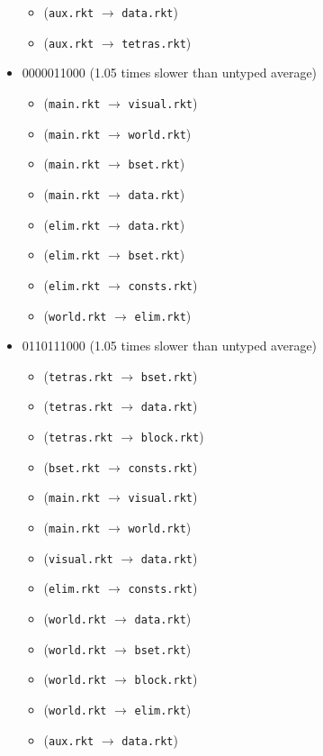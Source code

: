 \documentclass{article}
\newcommand{\mono}[1]{\texttt{#1}}
\begin{document}
\begin{itemize}
\begin{itemize}
  \item (\mono{aux.rkt} $\rightarrow$ \mono{data.rkt})
  \item (\mono{aux.rkt} $\rightarrow$ \mono{tetras.rkt})
  \end{itemize}
\item 0000011000 (1.05 times slower than untyped average)
  \begin{itemize}
  \item (\mono{main.rkt} $\rightarrow$ \mono{visual.rkt})
  \item (\mono{main.rkt} $\rightarrow$ \mono{world.rkt})
  \item (\mono{main.rkt} $\rightarrow$ \mono{bset.rkt})
  \item (\mono{main.rkt} $\rightarrow$ \mono{data.rkt})
  \item (\mono{elim.rkt} $\rightarrow$ \mono{data.rkt})
  \item (\mono{elim.rkt} $\rightarrow$ \mono{bset.rkt})
  \item (\mono{elim.rkt} $\rightarrow$ \mono{consts.rkt})
  \item (\mono{world.rkt} $\rightarrow$ \mono{elim.rkt})
  \end{itemize}
\item 0110111000 (1.05 times slower than untyped average)
  \begin{itemize}
  \item (\mono{tetras.rkt} $\rightarrow$ \mono{bset.rkt})
  \item (\mono{tetras.rkt} $\rightarrow$ \mono{data.rkt})
  \item (\mono{tetras.rkt} $\rightarrow$ \mono{block.rkt})
  \item (\mono{bset.rkt} $\rightarrow$ \mono{consts.rkt})
  \item (\mono{main.rkt} $\rightarrow$ \mono{visual.rkt})
  \item (\mono{main.rkt} $\rightarrow$ \mono{world.rkt})
  \item (\mono{visual.rkt} $\rightarrow$ \mono{data.rkt})
  \item (\mono{elim.rkt} $\rightarrow$ \mono{consts.rkt})
  \item (\mono{world.rkt} $\rightarrow$ \mono{data.rkt})
  \item (\mono{world.rkt} $\rightarrow$ \mono{bset.rkt})
  \item (\mono{world.rkt} $\rightarrow$ \mono{block.rkt})
  \item (\mono{world.rkt} $\rightarrow$ \mono{elim.rkt})
  \item (\mono{aux.rkt} $\rightarrow$ \mono{data.rkt})

\end{itemize}
\end{itemize}
\end{document}

